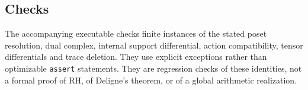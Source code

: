 \documentclass[
]{article}
\begin{document}
\subsection{Checks}\label{checks}

The accompanying executable checks finite instances of the stated poset
resolution, dual complex, internal support differential, action
compatibility, tensor differentials and trace deletion. They use
explicit exceptions rather than optimizable \texttt{assert} statements.
They are regression checks of these identities, not a formal proof of
RH, of Deligne's theorem, or of a global arithmetic realization.
\end{document}
